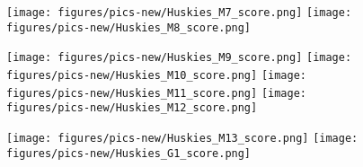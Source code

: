 \documentclass{mcmthesis}
\begin{document}
\begin{appendices}
\begin{figure}[h]
\texttt{[image: figures/pics-new/Huskies\_M7\_score.png]}
\texttt{[image: figures/pics-new/Huskies\_M8\_score.png]}
\end{figure}
\begin{figure}[h]\centering
\texttt{[image: figures/pics-new/Huskies\_M9\_score.png]}
\texttt{[image: figures/pics-new/Huskies\_M10\_score.png]}
\texttt{[image: figures/pics-new/Huskies\_M11\_score.png]}
\texttt{[image: figures/pics-new/Huskies\_M12\_score.png]}
\end{figure}
\begin{figure}[h]
\texttt{[image: figures/pics-new/Huskies\_M13\_score.png]}
\texttt{[image: figures/pics-new/Huskies\_G1\_score.png]}
\end{figure}


\end{appendices}
\end{document}
